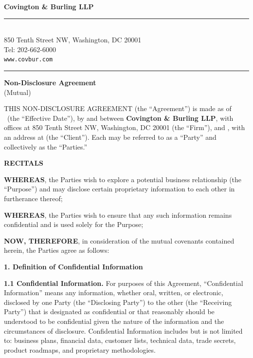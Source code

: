 \documentclass[11pt,letterpaper]{article}
\newcommand{\letterhead}{%
  \begin{center}
    \textcolor{DarkNavy}{\Huge \textbf{Covington \& Burling LLP}} \\[2pt]
    \textcolor{MutedGold}{\rule{0.6\textwidth}{0.5pt}} \\[4pt]
    \textcolor{DarkNavy!70!black}{\small 850 Tenth Street NW, Washington, DC 20001 \\
    Tel: 202-662-6000 \\
    \texttt{www.covbur.com}}
  \end{center}
  \vspace{0.4cm}
  \textcolor{MutedGold}{\rule{\textwidth}{1pt}}
  \vspace{0.3cm}
}
\begin{document}

\letterhead

\begin{center}
  \vspace{0.2cm}
  \textcolor{DarkNavy}{\LARGE \textbf{Non-Disclosure Agreement}} \\[4pt]
  \textcolor{DarkNavy!60!black}{\large (Mutual)}
\end{center}
\vspace{0.3cm}

\noindent THIS NON-DISCLOSURE AGREEMENT (the ``Agreement'') is made as of
\EffectiveDate\ (the ``Effective Date''), by and between
\textbf{Covington \& Burling LLP}, with offices at 850 Tenth Street NW,
Washington, DC 20001 (the ``Firm''), and \textbf{\ClientName}, with an address
at \textbf{\ClientAddress} (the ``Client''). Each may be referred to as a
``Party'' and collectively as the ``Parties.''

\vspace{0.4cm}
\noindent \textcolor{DarkNavy}{\large \textbf{RECITALS}}

\vspace{0.2cm}
\noindent \textcolor{DarkNavy!70!black}{\textbf{WHEREAS}}, the Parties wish to
explore a potential business relationship (the ``Purpose'') and may disclose
certain proprietary information to each other in furtherance thereof;

\noindent \textcolor{DarkNavy!70!black}{\textbf{WHEREAS}}, the Parties wish to
ensure that any such information remains confidential and is used solely for
the Purpose;

\noindent \textcolor{DarkNavy!70!black}{\textbf{NOW, THEREFORE}}, in
consideration of the mutual covenants contained herein, the Parties agree as
follows:

\vspace{0.4cm}
\noindent \textcolor{DarkNavy}{\large \textbf{1. Definition of Confidential Information}}

\noindent \textbf{1.1 Confidential Information.} For purposes of this
Agreement, ``Confidential Information'' means any information, whether oral,
written, or electronic, disclosed by one Party (the ``Disclosing Party'') to
the other (the ``Receiving Party'') that is designated as confidential or that
reasonably should be understood to be confidential given the nature of the
information and the circumstances of disclosure. Confidential Information
includes but is not limited to: business plans, financial data, customer lists,
technical data, trade secrets, product roadmaps, and proprietary methodologies.
\end{document}
